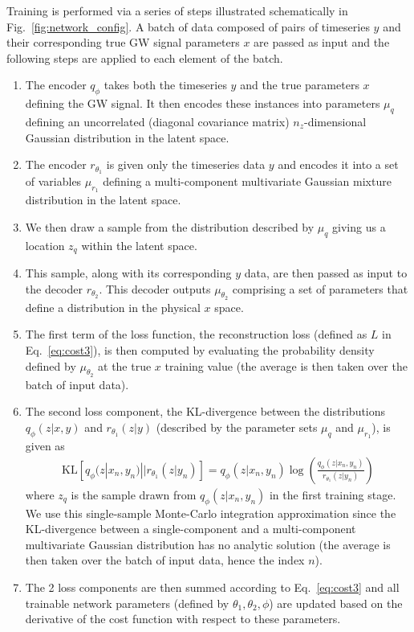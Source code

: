 %
%
Training is performed via a series of steps illustrated schematically in Fig.~\ref{fig:network_config}. A batch of data composed of pairs of timeseries $y$ and their corresponding true \ac{GW} signal parameters $x$ are passed as input and the following steps are applied to each element of the batch.
%
\begin{enumerate}
%
\item The encoder $q_{\phi}$ takes both the timeseries $y$ and the true parameters $x$ defining the \ac{GW} signal. It then encodes these instances into parameters $\mu_{q}$ defining an uncorrelated (diagonal covariance matrix) $n_z$-dimensional Gaussian distribution in the latent space. 
%
\item The encoder $r_{\theta_1}$ is given only the timeseries data $y$ and encodes it into a set of variables $\mu_{r_1}$ defining a multi-component multivariate Gaussian mixture distribution in the latent space.
%
\item We then draw a sample from the distribution described by $\mu_{q}$ giving us a location $z_{q}$ within the latent space.
%
\item This sample, along with its corresponding $y$ data, are then passed as input to the decoder $r_{\theta_2}$. This decoder outputs $\mu_{\theta_2}$ comprising a set of parameters that define a distribution in the physical $x$ space. 
\item The first term of the loss function, the reconstruction loss (defined as $L$ in Eq.~\ref{eq:cost3}), is then computed by evaluating the probability density defined by $\mu_{\theta_2}$ at the true $x$ training value (the average is then taken over the batch of input data). 
%
\item The second loss component, the \ac{KL}-divergence between the distributions $q_{\phi}(z|x,y)$ and $r_{\theta_1}(z|y)$ (described by the parameter sets $\mu_{q}$ and $\mu_{r_1}$), is given as 
%
\begin{align}\label{eq:klgauss}
\text{KL}\left[ q_{\phi}(z|x_{n},y_{n})||r_{\theta_{1}}(z|y_{n})\right] 
= q_{\phi}(z|x_n,y_n) \log\left(\frac{q_{\phi}(z|x_n,y_n)}{r_{\theta_1}(z|y_n)}\right) \nonumber
\end{align}
%
where $z_q$ is the sample drawn from $q_{\phi}(z|x_n,y_n)$ in the first 
training stage. We use this single-sample Monte-Carlo integration 
approximation since the \ac{KL}-divergence between a single-component 
and a multi-component multivariate Gaussian distribution has no analytic 
solution (the average is then taken over the batch of input 
data, hence the index $n$). 
%
\item The 2 loss components are then summed according to 
Eq.~\ref{eq:cost3} and all trainable network parameters 
(defined by $\theta_1,\theta_2,\phi$) are updated based on 
the derivative of the cost function with respect to these parameters.
%
\end{enumerate}

